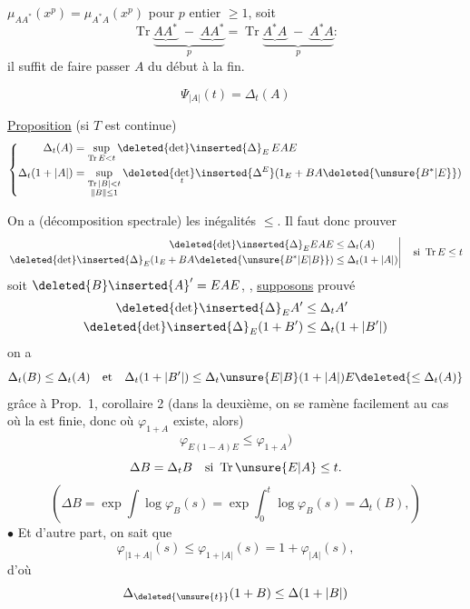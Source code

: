$\mu_{AA^*}(x^p)=\mu_{A^*A}(x^p)$ pour $p$ entier $\geq1$, soit
\[
\operatorname{Tr}\underbrace{\underbrace{AA^*}\; - \;\underbrace{AA^*}}_{p}
=\operatorname{Tr}\underbrace{\underbrace{A^*A}\; - \;\underbrace{A^*A}}_{p}:
\]
il suffit de faire passer $A$ du début à la fin.

\[
\Psi_{|A|}(t)=\Delta_t(A)
\]

\uline{Proposition} (si $T$ est continue)
\[
\left\{\begin{aligned}
\Delta_t(A)&=\sup_{\operatorname{Tr}E<t}\deleted{\det}\inserted{\Delta}_E\,EAE\\
\Delta_t(1+|A|)&=\sup_{\substack{\operatorname{Tr}|B|<t\\\|B\|\leq1}}
\deleted{\det_t}\inserted{\Delta^E}(1_E+BA\deleted{\unsure{B^*|E}})
\end{aligned}\right.
\]

On a (décomposition spectrale) les inégalités $\leq$. Il faut donc prouver
\[
\left.\begin{aligned}
\deleted{\det}\inserted{\Delta}_E EAE&\leq\Delta_t(A)\\
\deleted{\det}\inserted{\Delta}_E(1_E+BA\deleted{\unsure{B^*|E|B}})&\leq\Delta_t(1+|A|)
\end{aligned}\right|\quad\text{si }\operatorname{Tr}E\leq t
\]
soit $\deleted{B}\inserted{A}'=EAE$,
, \uline{supposons} prouvé
\[
\begin{aligned}
\deleted{\det}\inserted{\Delta}_E A'&\leq\Delta_t A'\\
\deleted{\det}\inserted{\Delta}_E(1+B')&\leq\Delta_t(1+|B'|)
\end{aligned}
\]
on a
\[
\Delta_t(B)\leq\Delta_t(A)
\quad\text{et}\quad
\Delta_t(1+|B'|)\leq\Delta_t\unsure{E|B}(1+|A|)E\deleted{\leq\Delta_t(A)}
\]
grâce à Prop.\ 1, corollaire 2 (dans la deuxième, on se ramène facilement au cas où la  est finie, donc où $\varphi_{1+A}$ existe, alors)
\[
\varphi_{E(1-A)E}\leq\varphi_{1+A})
\]
\deleted{$\det$}
\[
\Delta B=\Delta_tB
\quad\text{si }\operatorname{Tr}\unsure{E|A}\leq t.
\]
\[
\left(\Delta B=\exp\int\log\varphi_B(s)
=\exp\int_0^t\log\varphi_B(s)=\Delta_t(B),\right)
\]
\noindent$\bullet$ Et d'autre part, on sait que
\[
\varphi_{|1+A|}(s)\leq\varphi_{1+|A|}(s)
=1+\varphi_{|A|}(s),
\]
d'où
\[
\Delta_{\deleted{\unsure{t}}}(1+B)\leq\Delta(1+|B|)
\]
